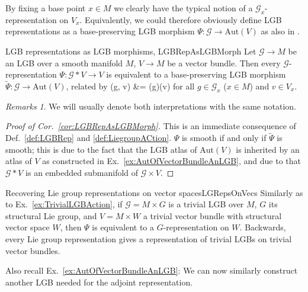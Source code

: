 \documentclass[a4paper,oneside,11pt,bibliography=totoc]{scrartcl}
\def\bas#1\eas{\begin{align*}#1\end{align*}}
\theoremstyle{plain}
\theoremstyle{remark}
\newtheorem{remark}[theorem]{Remarks}
\theoremstyle{definition}
\begin{document}
By fixing a base point $x \in M$ we clearly have the typical notion of a $\mathcal{G}_x$-representation on $V_x$. Equivalently, we could therefore obviously define LGB representations as a base-preserving LGB morphism $\Psi: \mathcal{G} \to \mathrm{Aut}(V)$ as also in \cite[\S 1.7, Def.\ 1.7.1, page 43]{mackenzieGeneralTheory}.

\begin{corollaries}{LGB representations as LGB morphisms, \newline \cite[\S 1.7, Prop.\ 1.7.2, page 43]{mackenzieGeneralTheory}}{LGBRepAsLGBMorph}
Let $\mathcal{G} \to M$ be an LGB over a smooth manifold $M$, $V \to M$ be a vector bundle. Then every $\mathcal{G}$-representation $\Psi: \mathcal{G} * V \to V$ is equivalent to a base-preserving LGB morphism $\widetilde{\Psi}: \mathcal{G} \to \mathrm{Aut}(V)$, related by
\bas
\Psi(g, v)
&=
\widetilde{\Psi}(g)(v)
\eas
for all $g \in \mathcal{G}_x$ ($x \in M$) and $v \in V_x$.
\end{corollaries}

\begin{remark}
\leavevmode\newline
We will usually denote both interpretations with the same notation.
\end{remark}

\begin{proof}[Proof of Cor.\ \ref{cor:LGBRepAsLGBMorph}]
\leavevmode\newline
This is an immediate consequence of Def.\ \ref{def:LGBRep} and \ref{def:LiegroupACtion}. $\Psi$ is smooth if and only if $\widetilde{\Psi}$ is smooth; this is due to the fact that the LGB atlas of $\mathrm{Aut}(V)$ is inherited by an atlas of $V$ as constructed in Ex.\ \ref{ex:AutOfVectorBundleAnLGB}, and due to that $\mathcal{G} * V$ is an embedded submanifold of $\mathcal{G} \times V$.
\end{proof}

\begin{examples}{Recovering Lie group representations on vector spaces}{LGRepsOnVecs}
Similarly as to Ex.\ \ref{ex:TrivialLGBAction}, if $\mathcal{G} = M \times G$ is a trivial LGB over $M$, $G$ its structural Lie group, and $V = M \times W$ a trivial vector bundle with structural vector space $W$, then $\Psi$ is equivalent to a $G$-representation on $W$. Backwards, every Lie group representation gives a representation of trivial LGBs on trivial vector bundles.
\end{examples}

Also recall Ex.\ \ref{ex:AutOfVectorBundleAnLGB}: We can now similarly construct another LGB needed for the adjoint representation.
\end{document}
